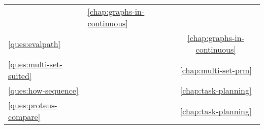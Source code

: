 \begin{center}
{\begin{tabular}{llc}
      \begin{minipage}[c]{0.83\columnwidth}%
      \begin{spacing}{0.7}
      \nameref{ques:batching}
      \end{spacing}%
      \vspace{0in}
      \end{minipage}%
      & \ref{chap:graphs-in-continuous} \\[12pt]
   \ref{ques:evalpath}
      &
      \begin{minipage}[c]{0.83\columnwidth}%
      \begin{spacing}{0.7}
      \nameref{ques:evalpath}
      \end{spacing}%
      \vspace{0in}
      \end{minipage}%
      & \ref{chap:graphs-in-continuous} \\[12pt]
   \ref{ques:multi-set-suited}
      &
      \begin{minipage}[c]{0.83\columnwidth}%
      \begin{spacing}{0.7}
      \nameref{ques:multi-set-suited}
      \end{spacing}%
      \vspace{0in}
      \end{minipage}%
      & \ref{chap:multi-set-prm} \\[12pt]
   \ref{ques:how-sequence}
      &
      \begin{minipage}[c]{0.83\columnwidth}%
      \begin{spacing}{0.7}
      \nameref{ques:how-sequence}
      \end{spacing}%
      \vspace{0in}
      \end{minipage}%
      & \ref{chap:task-planning} \\[12pt]
   \ref{ques:proteus-compare}
      &
      \begin{minipage}[c]{0.83\columnwidth}%
      \begin{spacing}{0.7}
      \nameref{ques:proteus-compare}
      \end{spacing}%
      \vspace{0in}
      \end{minipage}%
      & \ref{chap:task-planning} \\[12pt]
\bottomrule
\end{tabular}
}%
\end{center}


